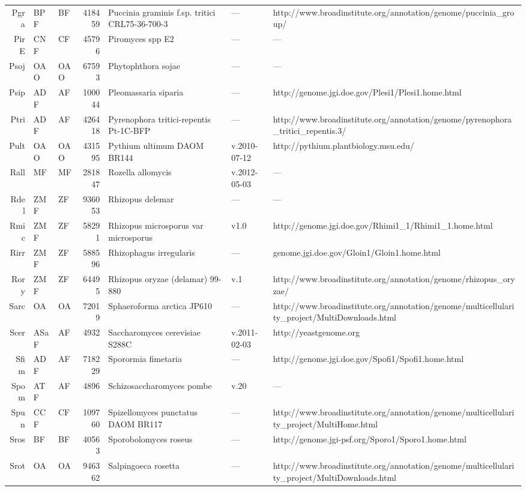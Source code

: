 \begin{table}[tbp]
\begin{tabular}{rllrlll}
  Pgra & BPF & BF & 418459 & Puccinia graminis f.sp. tritici CRL75-36-700-3 & --- & http://www.broadinstitute.org/annotation/genome/puccinia\_group/ \\ 
  PirE & CNF & CF & 45796 & Piromyces spp E2 & --- & --- \\ 
  Psoj & OAO & OAO & 67593 & Phytophthora sojae & --- & --- \\ 
  Psip & ADF & AF & 100044 & Pleomassaria siparia & --- & http://genome.jgi.doe.gov/Plesi1/Plesi1.home.html \\ 
  Ptri & ADF & AF & 426418 & Pyrenophora tritici-repentis Pt-1C-BFP & --- & http://www.broadinstitute.org/annotation/genome/pyrenophora\_tritici\_repentis.3/ \\ 
  Pult & OAO & OAO & 431595 & Pythium ultimum DAOM BR144 & v.2010-07-12 & http://pythium.plantbiology.msu.edu/ \\ 
  Rall & MF & MF & 281847 & Rozella allomycis & v.2012-05-03 & --- \\ 
  Rdel & ZMF & ZF & 936053 & Rhizopus delemar & --- & --- \\ 
  Rmic & ZMF & ZF & 58291 & Rhizopus microsporus var microsporus & v1.0 & http://genome.jgi.doe.gov/Rhimi1\_1/Rhimi1\_1.home.html \\ 
  Rirr & ZMF & ZF & 588596 & Rhizophagus irregularis & --- & genome.jgi.doe.gov/Gloin1/Gloin1.home.html \\ 
  Rory & ZMF & ZF & 64495 & Rhizopus oryzae (delamar) 99-880 & v.1 & http://www.broadinstitute.org/annotation/genome/rhizopus\_oryzae/ \\ 
  Sarc & OA & OA & 72019 & Sphaeroforma arctica JP610 & --- & http://www.broadinstitute.org/annotation/genome/multicellularity\_project/MultiDownloads.html \\ 
  Scer & ASaF & AF & 4932 & Saccharomyces cerevisiae S288C & v.2011-02-03 & http://yeastgenome.org \\ 
  Sfim & ADF & AF & 718229 & Sporormia fimetaria & --- & http://genome.jgi.doe.gov/Spofi1/Spofi1.home.html \\ 
  Spom & ATF & AF & 4896 & Schizosaccharomyces pombe & v.20 & --- \\ 
  Spun & CCF & CF & 109760 & Spizellomyces punctatus DAOM BR117 & --- & http://www.broadinstitute.org/annotation/genome/multicellularity\_project/MultiHome.html \\ 
  Sros & BF & BF & 40563 & Sporobolomyces roseus & --- & http://genome.jgi-psf.org/Sporo1/Sporo1.home.html \\ 
  Srot & OA & OA & 946362 & Salpingoeca rosetta & --- & http://www.broadinstitute.org/annotation/genome/multicellularity\_project/MultiDownloads.html \\ 

\end{tabular}
\end{table}

